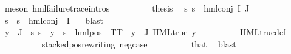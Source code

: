 \begin{isabellebody}
\ {\isacharparenleft}{\kern0pt}meson\ hml{\isacharunderscore}{\kern0pt}failure{\isacharunderscore}{\kern0pt}trace{\isachardot}{\kern0pt}intros{\isacharparenleft}{\kern0pt}{}{\isacharparenright}{\kern0pt}{\isacharparenright}{\kern0pt}\isanewline
\ \ \ \ \ \ \isamarkupfalse%
\ \isamarkupfalse%
\ {\isacharquery}{\kern0pt}thesis\ \isamarkupfalse%
\ {\isacartoucheopen}{\isasymforall}s{\isachardot}{\kern0pt}\ {\isasymnot}s\ {\isasymTurnstile}\ {\isacharparenleft}{\kern0pt}hml{\isacharunderscore}{\kern0pt}conj\ I\ J\ {\isasymPhi}{\isacharparenright}{\kern0pt}{\isacartoucheclose}\ \isanewline
\ \ \ \ \ \ \ \ \isamarkupfalse%
\ {\isacartoucheopen}{\isasymforall}s{\isachardot}{\kern0pt}\ {\isasymnot}\ s\ {\isasymTurnstile}\ hml{\isacharunderscore}{\kern0pt}conj\ {\isacharbraceleft}{\kern0pt}{\isacharbraceright}{\kern0pt}\ I\ {\isasymPsi}{\isacartoucheclose}\ \isamarkupfalse%
\ blast\isanewline
\ \ \ \ \isamarkupfalse%
\isanewline
\ \ \ \ \ \ \isamarkupfalse%
\ {}\isanewline
\ \ \ \ \ \ \isamarkupfalse%
\ {\isachardoublequoteopen}{\isasymforall}y\ {\isasymin}\ {\isasymPhi}{\isacharbackquote}{\kern0pt}J{\isachardot}{\kern0pt}\ {\isasymexists}{\isasymalpha}{\isachardot}{\kern0pt}\ {\isacharparenleft}{\kern0pt}{\isasymforall}s{\isachardot}{\kern0pt}\ {\isacharparenleft}{\kern0pt}s\ {\isasymTurnstile}\ y{\isacharparenright}{\kern0pt}\ {\isasymlongleftrightarrow}\ {\isacharparenleft}{\kern0pt}s\ {\isasymTurnstile}\ {\isacharparenleft}{\kern0pt}hml{\isacharunderscore}{\kern0pt}pos\ {\isasymalpha}\ TT{\isacharparenright}{\kern0pt}{\isacharparenright}{\kern0pt}{\isacharparenright}{\kern0pt}{\isachardoublequoteclose}\ {\isacharbar}{\kern0pt}\ {\isachardoublequoteopen}{\isacharparenleft}{\kern0pt}{\isasymexists}y{\isasymin}{\isasymPhi}\ {\isacharbackquote}{\kern0pt}\ J{\isachardot}{\kern0pt}\ HML{\isacharunderscore}{\kern0pt}true\ y{\isacharparenright}{\kern0pt}{\isachardoublequoteclose}\isanewline
\ \ \ \ \ \ \ \ \isamarkupfalse%
\ HML{\isacharunderscore}{\kern0pt}true{\isacharunderscore}{\kern0pt}def\isanewline
\ \ \ \ \ \ \ \ \isamarkupfalse%
\ stacked{\isacharunderscore}{\kern0pt}pos{\isacharunderscore}{\kern0pt}rewriting\ neg{\isacharunderscore}{\kern0pt}case\isanewline
\ \ \ \ \ \ \ \ \isamarkupfalse%
\ that{\isacharparenleft}{\kern0pt}{}{\isacharparenright}{\kern0pt}\ \isamarkupfalse%
\ blast\isanewline
\ \ \ \ \ \ \isamarkupfalse%

\end{isabellebody}
